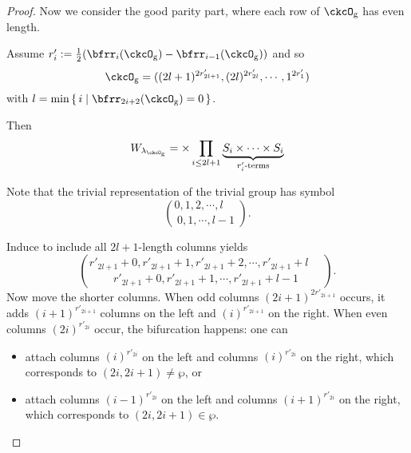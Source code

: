 \documentclass[12pt,a4paper]{amsart}
\numberwithin{equation}{section}
\theoremstyle{remark}
\def\half{{\tfrac{1}{2}}}
\def\lamckg{\lambda_{\ckcO_{\mathrm g}}}
\begin{document}
\begin{proof}
{      Now we consider the good parity part, where each row of $\ckcO_{\mathrm g}$ has
      even length.

      Assume $r'_{i} := \half(\bfrr_{i}(\ckcO_{\mathrm g})-\bfrr_{i-1}(\ckcO_{\mathrm g}))$ and
      so
      \[
        \ckcO_{\mathrm g} %
        = ((2l+1)^{2r'_{2l+1}}, (2l)^{2r'_{2l}},\cdots, 1^{2r'_{1}})
      \]
      with $l =\min\set{i|\bfrr_{2i+2}(\ckcO_{\mathrm g}) = 0}$.

      Then
      \[
        W_{\lamckg} = \times \prod_{i\leq 2l+1} \underbrace{S_{i}\times \cdots\times S_{i}}_{r'_{i}\text{-terms}}
      \]

      Note that the trivial representation of the trivial group has symbol
      \[
        \binom{0,1, 2, \cdots, l\phantom{-1}}{0,1, \cdots, l-1}.
      \]


      Induce to include all $2l+1$-length columns yields
      \[
        \binom{r'_{2l+1}+0,r'_{2l+1}+1,r'_{2l+1}+2,\cdots, r'_{2l+1}+l\phantom{-1}}{ r'_{2l+1}+0,r'_{2l+1}+1, \cdots, r'_{2l+1}+l-1}.
      \]
      Now move the shorter columns. When odd columns $(2i+1)^{2r'_{2i+1}}$
      occurs, it adds $(i+1)^{r'_{2i+1}}$ columns on the left and
      $(i)^{r'_{2i+1}}$ on the right. When even columns $(2i)^{r'_{2i}}$ occur,
      the bifurcation happens: one can
      \begin{itemize}
        \item attach columns $(i)^{r'_{2i}}$ on the left and columns
              $(i)^{r'_{2i}}$ on the right, which corresponds to
              $(2i,2i+1)\neq \wp$, or
        \item attach columns $(i-1)^{r'_{2i}}$ on the left and columns
              $(i+1)^{r'_{2i}}$ on the right, which corresponds to
              $(2i,2i+1)\in \wp$.
      \end{itemize}


}
\end{proof}
\end{document}

